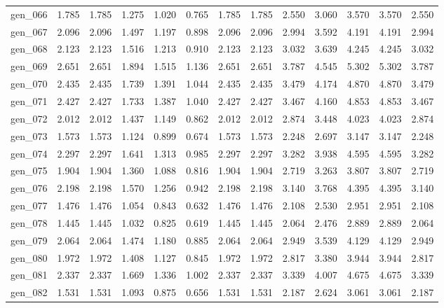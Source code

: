 \begin{tabular}{lrrrrrrrrrrrr}
gen\_066 &  1.785 &  1.785 &  1.275 &  1.020 &  0.765 &  1.785 &  1.785 &  2.550 &  3.060 &  3.570 &  3.570 &  2.550 \\
gen\_067 &  2.096 &  2.096 &  1.497 &  1.197 &  0.898 &  2.096 &  2.096 &  2.994 &  3.592 &  4.191 &  4.191 &  2.994 \\
gen\_068 &  2.123 &  2.123 &  1.516 &  1.213 &  0.910 &  2.123 &  2.123 &  3.032 &  3.639 &  4.245 &  4.245 &  3.032 \\
gen\_069 &  2.651 &  2.651 &  1.894 &  1.515 &  1.136 &  2.651 &  2.651 &  3.787 &  4.545 &  5.302 &  5.302 &  3.787 \\
gen\_070 &  2.435 &  2.435 &  1.739 &  1.391 &  1.044 &  2.435 &  2.435 &  3.479 &  4.174 &  4.870 &  4.870 &  3.479 \\
gen\_071 &  2.427 &  2.427 &  1.733 &  1.387 &  1.040 &  2.427 &  2.427 &  3.467 &  4.160 &  4.853 &  4.853 &  3.467 \\
gen\_072 &  2.012 &  2.012 &  1.437 &  1.149 &  0.862 &  2.012 &  2.012 &  2.874 &  3.448 &  4.023 &  4.023 &  2.874 \\
gen\_073 &  1.573 &  1.573 &  1.124 &  0.899 &  0.674 &  1.573 &  1.573 &  2.248 &  2.697 &  3.147 &  3.147 &  2.248 \\
gen\_074 &  2.297 &  2.297 &  1.641 &  1.313 &  0.985 &  2.297 &  2.297 &  3.282 &  3.938 &  4.595 &  4.595 &  3.282 \\
gen\_075 &  1.904 &  1.904 &  1.360 &  1.088 &  0.816 &  1.904 &  1.904 &  2.719 &  3.263 &  3.807 &  3.807 &  2.719 \\
gen\_076 &  2.198 &  2.198 &  1.570 &  1.256 &  0.942 &  2.198 &  2.198 &  3.140 &  3.768 &  4.395 &  4.395 &  3.140 \\
gen\_077 &  1.476 &  1.476 &  1.054 &  0.843 &  0.632 &  1.476 &  1.476 &  2.108 &  2.530 &  2.951 &  2.951 &  2.108 \\
gen\_078 &  1.445 &  1.445 &  1.032 &  0.825 &  0.619 &  1.445 &  1.445 &  2.064 &  2.476 &  2.889 &  2.889 &  2.064 \\
gen\_079 &  2.064 &  2.064 &  1.474 &  1.180 &  0.885 &  2.064 &  2.064 &  2.949 &  3.539 &  4.129 &  4.129 &  2.949 \\
gen\_080 &  1.972 &  1.972 &  1.408 &  1.127 &  0.845 &  1.972 &  1.972 &  2.817 &  3.380 &  3.944 &  3.944 &  2.817 \\
gen\_081 &  2.337 &  2.337 &  1.669 &  1.336 &  1.002 &  2.337 &  2.337 &  3.339 &  4.007 &  4.675 &  4.675 &  3.339 \\
gen\_082 &  1.531 &  1.531 &  1.093 &  0.875 &  0.656 &  1.531 &  1.531 &  2.187 &  2.624 &  3.061 &  3.061 &  2.187 \\

\end{tabular}
